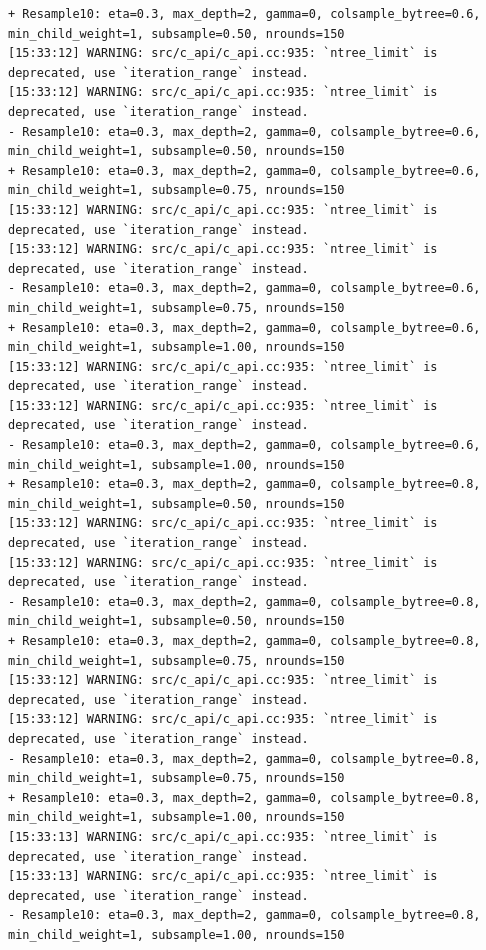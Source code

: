 \documentclass[
  letterpaper,
  DIV=11,
  numbers=noendperiod]{scrartcl}
\begin{document}
\begin{verbatim}
+ Resample10: eta=0.3, max_depth=2, gamma=0, colsample_bytree=0.6, min_child_weight=1, subsample=0.50, nrounds=150 
[15:33:12] WARNING: src/c_api/c_api.cc:935: `ntree_limit` is deprecated, use `iteration_range` instead.
[15:33:12] WARNING: src/c_api/c_api.cc:935: `ntree_limit` is deprecated, use `iteration_range` instead.
- Resample10: eta=0.3, max_depth=2, gamma=0, colsample_bytree=0.6, min_child_weight=1, subsample=0.50, nrounds=150 
+ Resample10: eta=0.3, max_depth=2, gamma=0, colsample_bytree=0.6, min_child_weight=1, subsample=0.75, nrounds=150 
[15:33:12] WARNING: src/c_api/c_api.cc:935: `ntree_limit` is deprecated, use `iteration_range` instead.
[15:33:12] WARNING: src/c_api/c_api.cc:935: `ntree_limit` is deprecated, use `iteration_range` instead.
- Resample10: eta=0.3, max_depth=2, gamma=0, colsample_bytree=0.6, min_child_weight=1, subsample=0.75, nrounds=150 
+ Resample10: eta=0.3, max_depth=2, gamma=0, colsample_bytree=0.6, min_child_weight=1, subsample=1.00, nrounds=150 
[15:33:12] WARNING: src/c_api/c_api.cc:935: `ntree_limit` is deprecated, use `iteration_range` instead.
[15:33:12] WARNING: src/c_api/c_api.cc:935: `ntree_limit` is deprecated, use `iteration_range` instead.
- Resample10: eta=0.3, max_depth=2, gamma=0, colsample_bytree=0.6, min_child_weight=1, subsample=1.00, nrounds=150 
+ Resample10: eta=0.3, max_depth=2, gamma=0, colsample_bytree=0.8, min_child_weight=1, subsample=0.50, nrounds=150 
[15:33:12] WARNING: src/c_api/c_api.cc:935: `ntree_limit` is deprecated, use `iteration_range` instead.
[15:33:12] WARNING: src/c_api/c_api.cc:935: `ntree_limit` is deprecated, use `iteration_range` instead.
- Resample10: eta=0.3, max_depth=2, gamma=0, colsample_bytree=0.8, min_child_weight=1, subsample=0.50, nrounds=150 
+ Resample10: eta=0.3, max_depth=2, gamma=0, colsample_bytree=0.8, min_child_weight=1, subsample=0.75, nrounds=150 
[15:33:12] WARNING: src/c_api/c_api.cc:935: `ntree_limit` is deprecated, use `iteration_range` instead.
[15:33:12] WARNING: src/c_api/c_api.cc:935: `ntree_limit` is deprecated, use `iteration_range` instead.
- Resample10: eta=0.3, max_depth=2, gamma=0, colsample_bytree=0.8, min_child_weight=1, subsample=0.75, nrounds=150 
+ Resample10: eta=0.3, max_depth=2, gamma=0, colsample_bytree=0.8, min_child_weight=1, subsample=1.00, nrounds=150 
[15:33:13] WARNING: src/c_api/c_api.cc:935: `ntree_limit` is deprecated, use `iteration_range` instead.
[15:33:13] WARNING: src/c_api/c_api.cc:935: `ntree_limit` is deprecated, use `iteration_range` instead.
- Resample10: eta=0.3, max_depth=2, gamma=0, colsample_bytree=0.8, min_child_weight=1, subsample=1.00, nrounds=150 

\end{verbatim}
\end{document}
